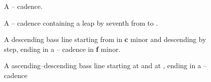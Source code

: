 \begin{figure}[h]
\centering
\begin{minipage}[b]{.45\textwidth}
\centering
{}
\vspace{6pt}
\end{minipage}
\begin{minipage}[b]{.45\textwidth}
\centering
{}
\vspace{3pt}
\end{minipage}
\begin{minipage}[t]{.45\textwidth}
\caption{A -- cadence. }
\end{minipage}
\begin{minipage}[t]{.45\textwidth}
\caption{A -- cadence containing a leap by seventh from  to . }
\end{minipage}
\end{figure}

\begin{figure}[h]
\hspace{-8pt}
\centering
{}
\caption{A descending bass line starting from  in \textbf{c} minor and descending by step, ending in a  --  cadence in \textbf{f} minor. }
\end{figure}
\begin{figure}[h]
\centering
{}
\caption{A ascending--descending bass line starting at  and  at , ending in a  --  cadence }
\end{figure}



